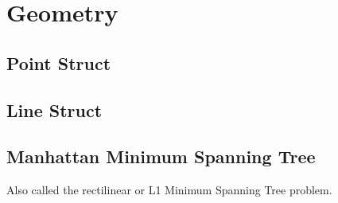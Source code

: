 \chapter{Geometry}

\section{Point Struct}


\section{Line Struct} 


\section{Manhattan Minimum Spanning Tree}

    Also called the rectilinear or L1 Minimum Spanning Tree problem.
    
